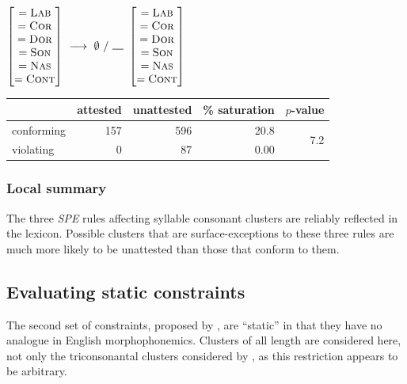 \begin{example}
$\begin{bmatrix} =\textsc{Lab} \\ =\textsc{Cor} \\ =\textsc{Dor} \\ =\textsc{Son} \\ =\textsc{Nas} \\ =\textsc{Cont} \end{bmatrix}~\goesto~\zero~/~\gap~\begin{bmatrix} =\textsc{Lab} \\ =\textsc{Cor} \\ =\textsc{Dor} \\ =\textsc{Son} \\ =\textsc{Nas} \\ =\textsc{Cont} \end{bmatrix}$
\end{example}


\begin{example}
\begin{tabular}{l r r r r}
\toprule
           & attested & unattested & \% saturation & $p$-value                   \\
\midrule
conforming & 157      & 596        & 20.8      & \multirow{2}{*}{7.2\e{-09}} \\
violating  & 0        &  87        & 0.00                                    \\
\bottomrule
\end{tabular}
\end{example}

\subsubsection{Local summary}

The three \emph{SPE} rules affecting syllable consonant clusters are reliably reflected in the lexicon. Possible clusters that are surface-exceptions to these three rules are much more likely to be unattested than those that conform to them.

\subsection{Evaluating static constraints}

The second set of constraints, proposed by \citet{Pierrehumbert1994}, are ``static'' in that they have no analogue in English morphophonemics. Clusters of all length are considered here, not only the triconsonantal clusters considered by \citeauthor{Pierrehumbert1994}, as this restriction appears to be arbitrary.

